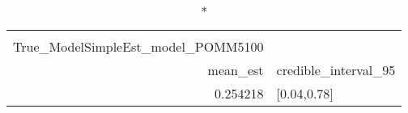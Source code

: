 \begin{longtable}{rl}
\caption*{
{\large Ssummarytable} \\ 
{\small True\_ModelSimpleEst\_model\_POMM5100}
} \\ 
\toprule
mean\_est & credible\_interval\_95 \\ 
\midrule
0.254218 & [0.04,0.78] \\ 
\bottomrule
\end{longtable}

